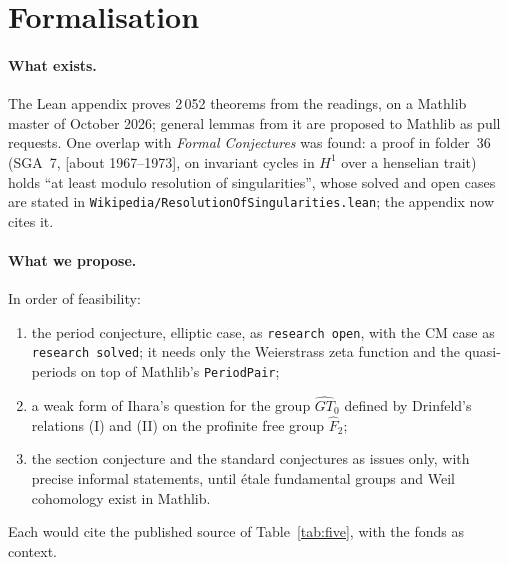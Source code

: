 \documentclass[11pt,a4paper]{article}
\newcommand{\q}[1]{“#1”}
\begin{document}
\section{Formalisation}

\paragraph{What exists.} The Lean appendix proves 2\,052 theorems from the
readings, on a Mathlib master of October 2026; general lemmas from it are
proposed to Mathlib as pull requests. One overlap with \emph{Formal
Conjectures} was found: a proof in folder~36 (SGA~7, [about 1967--1973], on invariant cycles in
$H^1$ over a henselian trait) holds \q{at least modulo resolution of
singularities}, whose solved and open cases are stated in
\texttt{Wikipedia/ResolutionOfSingularities.lean}; the appendix now cites it.

\paragraph{What we propose.} In order of feasibility:
\begin{enumerate}
\item the period conjecture, elliptic case, as \texttt{research open}, with
  the CM case as \texttt{research solved}; it needs only the Weierstrass zeta
  function and the quasi-periods on top of Mathlib's \texttt{PeriodPair};
\item a weak form of Ihara's question for the group $\widehat{GT}_0$ defined
  by Drinfeld's relations (I) and (II) on the profinite free group $\widehat F_2$;
\item the section conjecture and the standard conjectures as issues only,
  with precise informal statements, until étale fundamental groups and Weil
  cohomology exist in Mathlib.
\end{enumerate}
Each would cite the published source of Table~\ref{tab:five}, with the fonds
as context.
\end{document}
